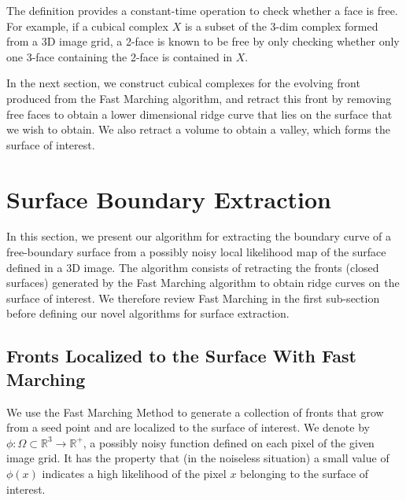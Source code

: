 \documentclass[10pt,journal,compsoc]{IEEEtran}
\newcommand{\R}{\mathbb{R}}
\begin{document}
The definition provides a constant-time operation to check whether a
face is free. For example, if a cubical complex $X$ is a subset of the
3-dim complex formed from a 3D image grid, a 2-face is known to be
free by only checking whether only one 3-face containing the 2-face is
contained in $X$.

In the next section, we construct cubical complexes for the evolving
front produced from the Fast Marching algorithm, and retract this
front by removing free faces to obtain a lower dimensional ridge curve
that lies on the surface that we wish to obtain. We also retract a
volume to obtain a valley, which forms the surface of interest.


\section{Surface Boundary Extraction}

In this section, we present our algorithm for extracting the boundary
curve of a free-boundary surface from a possibly noisy local
likelihood map of the surface defined in a 3D image. The algorithm
consists of retracting the fronts (closed surfaces) generated by the
Fast Marching algorithm to obtain ridge curves on the surface of
interest. We therefore review Fast Marching in the first sub-section
before defining our novel algorithms for surface extraction.

\subsection{Fronts Localized to the Surface With Fast Marching}

\label{subsec:fast_marching}

We use the Fast Marching Method \cite{sethian1996fast} to generate a
collection of fronts that grow from a seed point and are localized to
the surface of interest. We denote by
$\phi : \Omega \subset \R^3 \to \mathbb{R}^+$, a possibly noisy
function defined on each pixel of the given image grid. It has the
property that (in the noiseless situation) a small value of $\phi(x)$
indicates a high likelihood of the pixel $x$ belonging to the surface
of interest.
\end{document}
